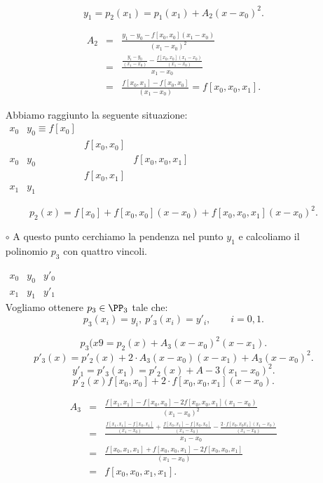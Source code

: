 \begin{itemize}
\[
y_1 = p_2(x_1) = p_1(x_1) + A_2(x-x_0)^2.
\]

\[
\begin{array}{lcl}
A_2 & = & \frac{y_1 - y_0 - f[x_0,x_0](x_1-x_0)}{(x_1-x_0)^2} \\ 
& = &\frac{\frac{y_1 - y_0}{(x_1 - x_0)} 
- \frac{f[x_0,x_0](x_1-x_0)}{(x_1 -x_0)}}{x_1-x_0} \\
& =  & \frac{f[x_0,x_1] - f[x_0,x_0]}{(x_1-x_0)} = f[x_0,x_0,x_1].
\end{array}
\]

Abbiamo raggiunto la seguente situazione:\\

$\begin{array}{llcc}
x_0 & y_0 \equiv f[x_0]  &   \\
    &     & f[x_0,x_0] \\
x_0 & y_0  &            & f[x_0,x_0,x_1]  \\
    &     & f[x_0,x_1] & \\
x_1 & y_1 &
\end{array}$

\[
p_2(x) = f[x_0] + f[x_0,x_0](x-x_0) + f[x_0,x_0,x_1](x-x_0)^2. 
\]

\item[$\circ$] A questo punto cerchiamo la pendenza nel punto $y_1$ e 
calcoliamo il polinomio $p_3$ con quattro vincoli.

$\begin{array}{lllc}
x_0 & y_0  & y'_0  \\
x_1 & y_1 & y'_1
\end{array}$\\

Vogliamo ottenere $p_3 \in \PP_3$ tale che:
\[
p_3(x_i) = y_i, \ p'_3(x_i) = y'_i, \qquad i = 0,1.
\]

\[p_3(x9 = p_2(x) + A_3(x-x_0)^2(x-x_1).\]
\[p'_3(x) = p'_2(x) + 2\cdot A_3(x-x_0)(x-x_1) + A_3(x-x_0)^2.\]
\[y'_1 = p'_3(x_1) = p'_2(x) + A-3(x_1-x_0)^2.\]
\[p'_2(x) f[x_0,x_0] + 2 \cdot f[x_0,x_0,x_1](x-x_0).\]

\[
\begin{array}{lcl}
A_3 & = & \frac{f[x_1,x_1]-f[x_0,x_0]-2f[x_0,x_0,x_1](x_1-x_0)}{(x_1-x_0)^2} \\ 
& = &\frac{\frac{f[x_1,x_1] - f[x_0,x_1]}{(x_1 - x_0)} 
+ \frac{f[x_0,x_1]-f[x_0,x_0]}{(x_1 -x_0)}
- \frac{2 \cdot f[x_0,x_0 x_1](x_1-x_0)}{(x_1 -x_0)}}{x_1-x_0} \\
& =  & \frac{f[x_0,x_1,x_1] + f[x_0,x_0,x_1] -2 f[x_0,x_0,x_1]}{(x_1-x_0)} \\
& = & f[x_0,x_0,x_1,x_1].
\end{array}
\]


\end{itemize}
